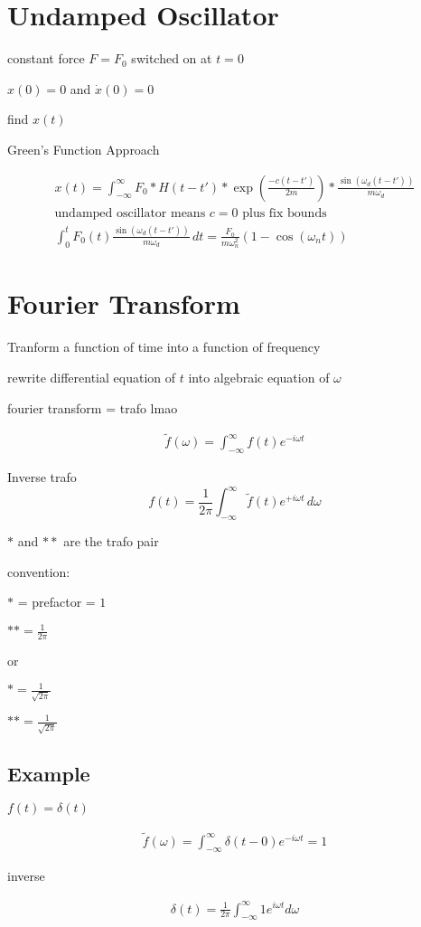 \documentclass[fleqn]{report}
\newcommand{\equations} [1] {
\begin{gather*}
#1
\end{gather*}
}
\begin{document}
\section{Undamped Oscillator}
constant force $F = F_0$ switched on at $t = 0$

$x(0) = 0$ and $\dot x(0) = 0$

find $x(t)$

Green's Function Approach 
\equations{
    x(t) = \int^{\infty}_{- \infty} F_0 * H(t - t') * 
    \exp(\frac{-c (t - t')}{2m}) * 
    \frac{\sin(\omega_d (t - t'))}{m \omega_d}
    \\
    \textrm{undamped oscillator means $c = 0$ plus fix bounds}
    \\
    \int^{t}_{0} F_0(t) 
    \frac{\sin(\omega_d (t - t'))}{m \omega_d}
    \, dt 
    =
    \frac{F_0}{m \omega_n^2} (1 - \cos(\omega_n t))
}

\section{Fourier Transform}
Tranform a function of time into a function of frequency 

rewrite differential equation of $t$ into algebraic equation of $\omega$

fourier transform = trafo lmao 

\equations{
    \tilde f(\omega) = 
    \int^{\infty}_{- \infty} f(t) e^{-i \omega t}
}

Inverse trafo 
\[
f(t) = \frac{1}{2 \pi} \int^{\infty}_{- \infty} 
\tilde f(t) e^{+i \omega t} \, d \omega
\]

$*$ and $**$ are the trafo pair 

convention: 

$*$ = prefactor = $1$

$** = \frac{1}{2 \pi}$

or 

$* = \frac{1}{\sqrt{2 \pi}}$

$** = \frac{1}{\sqrt{2 \pi}}$

\subsection{Example}
$f(t) = \delta(t)$

\equations{
    \tilde f(\omega) = 
    \int^{\infty}_{- \infty} \delta(t - 0) e^{-i\omega t}
    = 1
}

inverse 
\equations{
    \delta(t) = \frac{1}{2\pi} \int^{\infty}_{- \infty} 
    1 e^{i \omega t} d\omega 
}
\end{document}
